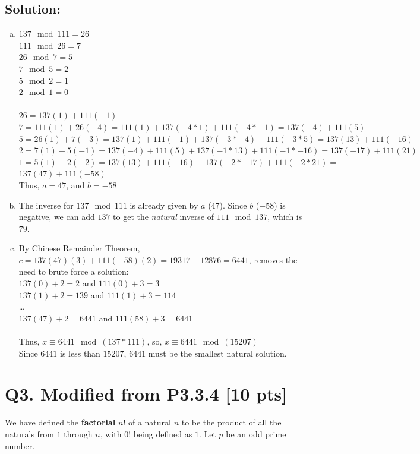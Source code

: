 \documentclass[12pt]{article}
\begin{document}
	\subsection*{\textbf{Solution:}}
	\begin{enumerate}[(a)]
		\item $137\mod111=26$\\
			$111\mod26=7$\\
			$26\mod7=5$\\
			$7\mod 5=2$\\
			$5\mod2=1$\\
			$2\mod1=0$\\
			\\
			$26=137(1)+111(-1)$\\
			$7=111(1)+26(-4)=111(1)+137(-4*1)+111(-4*-1)=137(-4)+111(5)$\\
			$5=26(1)+7(-3)=137(1)+111(-1)+137(-3*-4)+111(-3*5)=137(13)+111(-16)$\\
			$2=7(1)+5(-1)=137(-4)+111(5)+137(-1*13)+111(-1*-16)=137(-17)+111(21)$\\
			$1=5(1)+2(-2)=137(13)+111(-16)+137(-2*-17)+111(-2*21)=$\\
			$137(47)+111(-58)$\\
			Thus, $a=47$, and $b=-58$

		\item The inverse for $137\mod111$ is already given by $a$ ($47$). Since $b$
			($-58$) is negative, we can add $137$ to get the \textit{natural} inverse
			of $111\mod137$, which is $79$.

		\item By Chinese Remainder Theorem,
			$c=137(47)(3)+111(-58)(2)=19317-12876=6441$, removes the need to brute force
			a solution:\\
			$137(0)+2=2$ and $111(0)+3=3$\\
			$137(1)+2=139$ and $111(1)+3=114$\\
			\ldots\\
			$137(47)+2=6441$ and $111(58)+3=6441$\\
			\\
			Thus, $x\equiv6441\mod(137*111)$, so, $x\equiv6441\mod(15207)$\\
			Since $6441$ is less than $15207$, $6441$ must be the smallest natural
			solution.
	\end{enumerate}

	\newpage

	\section*{\textbf{Q3. Modified from P3.3.4} [10 pts]}
	We have defined the \textbf{factorial} $n!$ of a natural $n$ to be the product
	of all the naturals from $1$ through $n$, with $0!$ being defined as $1$. Let
	$p$ be an odd prime number.
\end{document}
